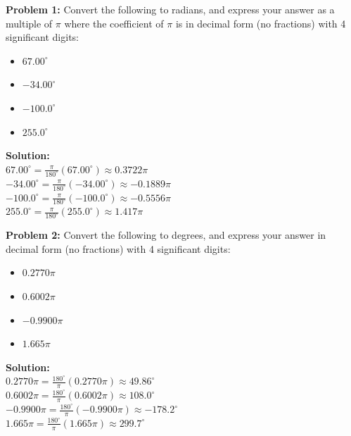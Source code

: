 \documentclass{article}
\newcommand{\dr}[1]{\textcolor{dark_red}{#1}}
\begin{document}
\begin{framed}
\textbf{Problem 1:} Convert the following to radians, and express your answer as a multiple of \(\pi\) where the coefficient of \(\pi\) is in decimal form (no fractions) with 4 significant digits:
\begin{itemize}
\item \(67.00^\circ\)
\item \(-34.00^\circ\)
\item \(-100.0^\circ\)
\item \(255.0^\circ\)
\end{itemize} 
\dr{\textbf{Solution:} \\
\(67.00^\circ = \frac{\pi}{180^\circ}(67.00^\circ) \approx 0.3722\pi\) \\
\(-34.00^\circ = \frac{\pi}{180^\circ}(-34.00^\circ) \approx -0.1889\pi\) \\
\(-100.0^\circ = \frac{\pi}{180^\circ}(-100.0^\circ) \approx -0.5556\pi\) \\
\(255.0^\circ = \frac{\pi}{180^\circ}(255.0^\circ) \approx 1.417\pi\)
}
\end{framed}
\begin{framed}
\textbf{Problem 2:} Convert the following to degrees, and express your answer in decimal form (no fractions) with 4 significant digits:
\begin{itemize}
\item \(0.2770\pi\)
\item \(0.6002\pi\)
\item \(-0.9900\pi\)
\item \(1.665\pi\)
\end{itemize}
\dr{\textbf{Solution:} \\
\(0.2770\pi = \frac{180^\circ}{\pi}(0.2770\pi) \approx 49.86^\circ\) \\
\(0.6002\pi = \frac{180^\circ}{\pi}(0.6002\pi) \approx 108.0^\circ\) \\
\(-0.9900\pi = \frac{180^\circ}{\pi}(-0.9900\pi) \approx -178.2^\circ\) \\
\(1.665\pi = \frac{180^\circ}{\pi}(1.665\pi) \approx 299.7^\circ\)
}
\end{framed}
\pagebreak
\end{document}
